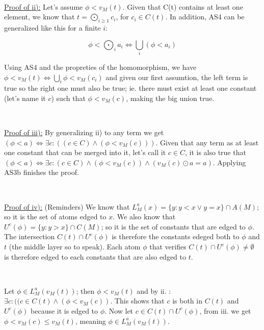 \documentclass[a4paper, 11pt]{article}
\begin{document}
\

\noindent
\underline{Proof of ii):} Let's assume $\phi < v_M(t)$. Given that C(t) contains at least one element, we know that $t = \bigodot_{i \geq 1} c_i$, for $c_i \in C(t)$. In addition, AS4 can be generalized like this for a finite $i$:

$$\phi < \bigodot_i a_i \Leftrightarrow \bigcup_i (\phi < a_i)$$

Using AS4 and the propreties of the homomorphism, we have $\phi < v_M(t) \Leftrightarrow \bigcup_i \phi < v_M(c_i)$ and given our first assumtion, the left term is true so the right one must also be true; ie. there must exist at least one constant (let's name it $c$) such that $\phi < v_M(c)$, making the big union true.

\

\noindent
\underline{Proof of iii):} By generalizing ii) to any term we get $(\phi < a) \Leftrightarrow \exists c : ((c \in C) \land (\phi < v_M(c)))$. Given that any term as at least one constant that can be merged into it, let's call it $c \in C$, it is also true that $(\phi < a) \Leftrightarrow \exists c : (c \in C) \land (\phi < v_M(c)) \land (v_M(c) \odot a = a)$. Applying AS3b finishes the proof.



\

\noindent
\underline{Proof of iv):} (Reminders) We know that $L_M^a(x) =\{y : y < x \lor y = x\} \cap A(M)$; so it is the set of atoms edged to $x$. We also know that $U^c(\phi) =\{y : y > x\} \cap C(M)$; so it is the set of constants that are edged to $\phi$. The intersection $C(t) \cap U^c(\phi)$ is therefore the constants edeged both to $\phi$ and $t$ (the middle layer so to speak). Each atom $\phi$ that verifies $C(t) \cap U^c(\phi) \neq \emptyset$ is therefore edged to each constants that are also edged to $t$.

\

Let $\phi \in L_M^a(v_M(t))$; then $\phi < v_M(t)$ and by ii. : $\exists c : ((c \in C(t) \land (\phi < v_M(c))$. This shows that $c$ is both in $C(t)$ and $U^c(\phi)$ because it is edged to $\phi$. Now let $c \in C(t) \cap U^c(\phi)$, from iii. we get $\phi < v_M(c) \leq v_M(t)$, meaning $\phi \in L_M^a(v_M(t))$. 
\end{document}
